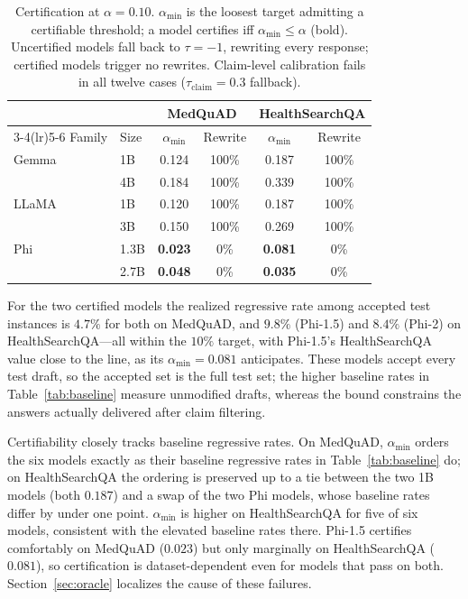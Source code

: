\documentclass[sigconf, review, anonymous]{acmart}
\begin{document}
\begin{table}[t]
\centering
\caption{Certification at $\alpha=0.10$. $\alpha_{\min}$ is the loosest
target admitting a certifiable threshold; a model certifies iff
$\alpha_{\min}\le\alpha$ (bold). Uncertified models fall back to $\tau=-1$,
rewriting every response; certified models trigger no rewrites. Claim-level
calibration fails in all twelve cases ($\tau_{\text{claim}}=0.3$ fallback).}
\label{tab:cert}
\small
\begin{tabular}{llcccc}
\toprule
& & \multicolumn{2}{c}{MedQuAD} & \multicolumn{2}{c}{HealthSearchQA} \\
\cmidrule(lr){3-4}\cmidrule(lr){5-6}
Family & Size & $\alpha_{\min}$ & Rewrite & $\alpha_{\min}$ & Rewrite \\
\midrule
Gemma & 1B   & 0.124 & 100\% & 0.187 & 100\% \\
      & 4B   & 0.184 & 100\% & 0.339 & 100\% \\
LLaMA & 1B   & 0.120 & 100\% & 0.187 & 100\% \\
      & 3B   & 0.150 & 100\% & 0.269 & 100\% \\
Phi   & 1.3B & \textbf{0.023} & 0\% & \textbf{0.081} & 0\% \\
      & 2.7B & \textbf{0.048} & 0\% & \textbf{0.035} & 0\% \\
\bottomrule
\end{tabular}
\end{table}

For the two certified models the realized regressive rate among accepted
test instances is $4.7\%$ for both on MedQuAD, and $9.8\%$ (Phi-1.5) and
$8.4\%$ (Phi-2) on HealthSearchQA---all within the $10\%$ target, with
Phi-1.5's HealthSearchQA value close to the line, as its
$\alpha_{\min}=0.081$ anticipates. These models accept every test draft, so
the accepted set is the full test set; the higher baseline rates in
Table~\ref{tab:baseline} measure unmodified drafts, whereas the bound
constrains the answers actually delivered after claim filtering.

Certifiability closely tracks baseline regressive rates. On MedQuAD,
$\alpha_{\min}$ orders the six models exactly as their baseline regressive
rates in Table~\ref{tab:baseline} do; on HealthSearchQA the ordering is
preserved up to a tie between the two 1B models (both $0.187$) and a swap
of the two Phi models, whose baseline rates differ by under one point. $\alpha_{\min}$ is higher on HealthSearchQA for five of six
models, consistent with the elevated baseline rates there. Phi-1.5
certifies comfortably on MedQuAD ($0.023$) but only marginally on
HealthSearchQA ($0.081$), so certification is dataset-dependent even for
models that pass on both. Section~\ref{sec:oracle} localizes the cause of
these failures.
\end{document}
